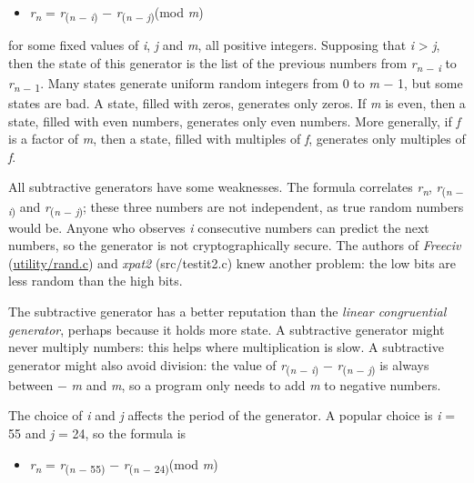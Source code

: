 \begin{itemize}
\item
  \emph{r}\textsubscript{\emph{n}} = \emph{r}\textsubscript{(\emph{n} −
  \emph{i})} − \emph{r}\textsubscript{(\emph{n} − \emph{j})}(mod
  \emph{m})
\end{itemize}

for some fixed values of \emph{i}, \emph{j} and \emph{m}, all positive
integers. Supposing that \emph{i} \textgreater{} \emph{j}, then the
state of this generator is the list of the previous numbers from
\emph{r}\textsubscript{\emph{n} − \emph{i}} to
\emph{r}\textsubscript{\emph{n} − 1}. Many states generate uniform
random integers from 0 to \emph{m} − 1, but some states are bad. A
state, filled with zeros, generates only zeros. If \emph{m} is even,
then a state, filled with even numbers, generates only even numbers.
More generally, if \emph{f} is a factor of \emph{m}, then a state,
filled with multiples of \emph{f}, generates only multiples of \emph{f}.

All subtractive generators have some weaknesses. The formula correlates
\emph{r}\textsubscript{\emph{n}}, \emph{r}\textsubscript{(\emph{n} −
\emph{i})} and \emph{r}\textsubscript{(\emph{n} − \emph{j})}; these
three numbers are not independent, as true random numbers would be.
Anyone who observes \emph{i} consecutive numbers can predict the next
numbers, so the generator is not cryptographically secure. The authors
of \emph{Freeciv}
(\href{http://svn.gna.org/viewcvs/freeciv/trunk/utility/rand.c?view=markup}{utility/rand.c})
and \emph{xpat2} (src/testit2.c) knew another problem: the low bits are
less random than the high bits.

The subtractive generator has a better reputation than the
\emph{linear congruential
generator}, perhaps because it holds more state. A subtractive generator
might never multiply numbers: this helps where multiplication is slow. A
subtractive generator might also avoid division: the value of
\emph{r}\textsubscript{(\emph{n} − \emph{i})} −
\emph{r}\textsubscript{(\emph{n} − \emph{j})} is always between −
\emph{m} and \emph{m}, so a program only needs to add \emph{m} to
negative numbers.

The choice of \emph{i} and \emph{j} affects the period of the generator.
A popular choice is \emph{i} = 55 and \emph{j} = 24, so the formula is

\begin{itemize}
\item
  \emph{r}\textsubscript{\emph{n}} = \emph{r}\textsubscript{(\emph{n} −
  55)} − \emph{r}\textsubscript{(\emph{n} − 24)}(mod \emph{m})
\end{itemize}

